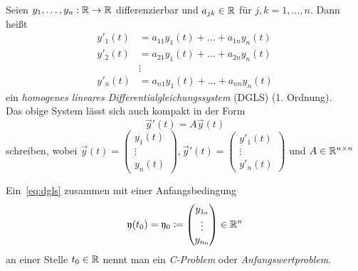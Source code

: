 \begin{definition}
    Seien $y_1,\dots,y_n: \mathbb{R} \to \mathbb{R}$ differenzierbar und $a_{jk} \in \mathbb{R}$ für $j,k = 1,\dots,n$.
    Dann heißt
    \begin{equation*}
        \begin{aligned}
            y'_1(t) &= a_{11} y_1(t) + \dots + a_{1n} y_n(t)\\
            y'_2(t) &= a_{21} y_1(t) + \dots + a_{2n} y_n(t)\\
            &\vdots\\
            y'_n(t) &= a_{n1} y_1(t) + \dots + a_{nn} y_n(t)
        \end{aligned}
    \end{equation*}
    ein \emph{homogenes lineares Differentialgleichungssystem} (DGLS) (1. Ordnung).\\
    Das obige System lässt sich auch kompakt in der Form
    \begin{equation}\tag{DGLS}\label{eq:dgls}
        \vec{y}'(t) = A \vec{y}(t)
    \end{equation}
    schreiben, wobei $\vec{y}(t) = \begin{pmatrix} y_1(t)\\ \vdots\\ y_n(t) \end{pmatrix}, \vec{y}'(t) = \begin{pmatrix} y'_1(t)\\ \vdots\\ y'_n(t) \end{pmatrix}$
    und $A \in \mathbb{R}^{n \times n}$
\end{definition}

\begin{definition}
    Ein~\ref{eq:dgls} zusammen mit einer Anfangsbedingung
    \begin{equation*}
        \mathfrak{y}(t_0) = \mathfrak{y}_0 \coloneqq \begin{pmatrix} y_{1_0}\\ \vdots\\ y_{n_0} \end{pmatrix} \in \mathbb{R}^n
    \end{equation*}
    an einer Stelle $t_0 \in \mathbb{R}$ nennt man ein \emph{C-Problem} oder \emph{Anfangswertproblem}.
\end{definition}


